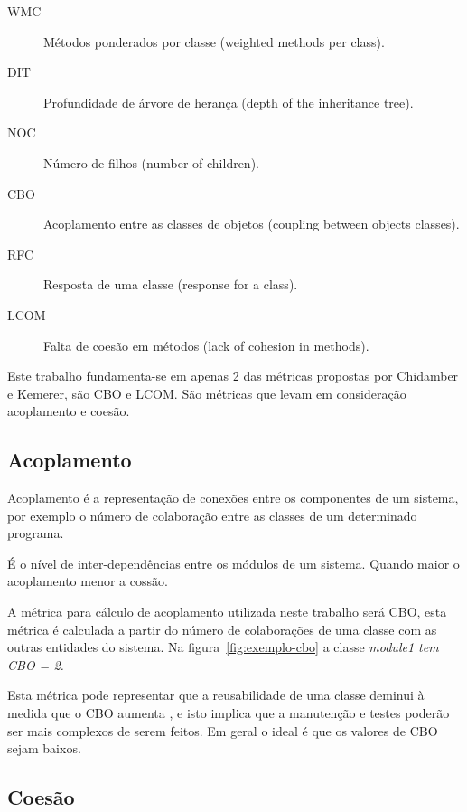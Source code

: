 \begin{description}
\item[WMC] Métodos ponderados por classe (weighted methods per class).
\item[DIT] Profundidade de árvore de herança (depth of the inheritance tree).
\item[NOC] Número de filhos (number of children).
\item[CBO] Acoplamento entre as classes de objetos (coupling between objects classes).
\item[RFC] Resposta de uma classe (response for a class).
\item[LCOM] Falta de coesão em métodos (lack of cohesion in methods).
\end{description}

Este trabalho fundamenta-se em apenas 2 das métricas propostas por Chidamber e
Kemerer, são CBO e LCOM. São métricas que levam em consideração acoplamento e
coesão.

\subsection{Acoplamento}

Acoplamento é a representação de conexões entre os componentes de um sistema,
por exemplo o número de colaboração entre as classes de um determinado
programa.

É o nível de inter-dependências entre os módulos de um sistema. Quando maior o
acoplamento menor a cossão.

A métrica para cálculo de acoplamento utilizada neste trabalho será CBO, esta
métrica é calculada a partir do número de colaborações de uma classe com as
outras entidades do sistema. Na figura~\ref{fig:exemplo-cbo} a classe
\it{module1} tem CBO = 2.

Esta métrica pode representar que a reusabilidade de uma classe deminui à
medida que o CBO aumenta \cite{engenhariaDeSoftwarePressman}, e isto implica
que a manutenção e testes poderão ser mais complexos de serem feitos. Em geral
o ideal é que os valores de CBO sejam baixos.

\subsection{Coesão}

